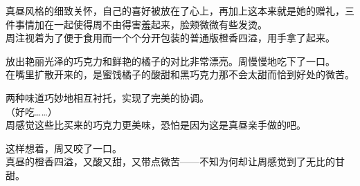 真昼风格的细致关怀，自己的喜好被放在了心上，再加上这本来就是她的赠礼，三件事情加在一起使得周不由得害羞起来，脸颊微微有些发烫。\\

周注视着为了便于食用而一个个分开包装的普通版橙香四溢，用手拿了起来。%

放出艳丽光泽的巧克力和鲜艳的橘子的对比非常漂亮。周慢慢地吃下了一口。\\

在嘴里扩散开来的，是蜜饯橘子的酸甜和黑巧克力那不会太甜而恰到好处的微苦。

两种味道巧妙地相互衬托，实现了完美的协调。\\

（好吃……）\\

周感觉这些比买来的巧克力更美味，恐怕是因为这是真昼亲手做的吧。

这样想着，周又咬了一口。\\

真昼的橙香四溢，又酸又甜，又带点微苦——不知为何却让周感觉到了无比的甘甜。
